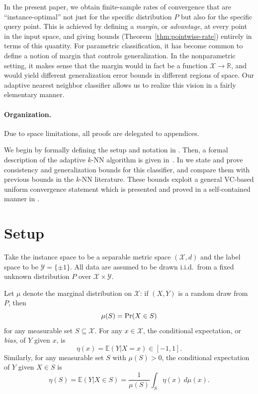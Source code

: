 \documentclass{article}
\def\R{{\mathbb{R}}}
\def\pr{{\rm Pr}}
\def\E{{\mathbb E}}
\def\X{{\mathcal X}}
\def\Y{{\mathcal Y}}
\begin{document}
In the present paper, we obtain finite-sample rates of convergence that are ``instance-optimal'' not just for the specific distribution $P$ but also for the specific query point. This is achieved by defining a {\it margin}, or {\it advantage}, at every point in the input space, and giving bounds (Theorem~\ref{thm:pointwise-rate}) entirely in terms of this quantity. For parametric classification, it has become common to define a notion of margin that controls generalization. In the nonparametric setting, it makes sense that the margin would in fact be a function $\X \rightarrow \R$, and would yield different generalization error bounds in different regions of space. Our adaptive nearest neighbor classifier allows us to realize this vision in a fairly elementary manner.

\paragraph{Organization.} 
Due to space limitations, all proofs are delegated to appendices.

We begin by formally defining the setup and notation in .
Then, a formal description of the adaptive $k$-NN algorithm is given in~.
In  we state and prove consistency and generalization
bounds for this classifier, and compare them with previous bounds in the $k$-NN literature.
These bounds exploit a general VC-based uniform convergence statement
which is presented and proved in a self-contained manner in .


\section{Setup}\label{sec:setup}

Take the instance space to be a separable metric space $(\X, d)$ and the label space to be $\Y = \{\pm 1\}$. All data are assumed to be drawn i.i.d.\ from a fixed unknown distribution $P$ over $\X \times \Y$.

Let $\mu$ denote the marginal distribution on $\X$: if $(X,Y)$ is a 
random draw from $P$, then
$$ \mu(S) = \pr(X \in S)$$
for any measurable set $S \subseteq \X$. For any $x \in \X$, the conditional expectation, or {\em bias}, of $Y$ given $x$, is
$$ \eta(x) = \E(Y| X = x) \in [-1,1] .$$ 
Similarly, for any measurable set $S$ with $\mu(S) > 0$, the
conditional expectation of $Y$ given $X \in S$ is
$$ \eta(S) = \E(Y| X \in S) = \frac{1}{\mu(S)} \int_S \eta(x) \ d \mu(x) .$$
\end{document}
